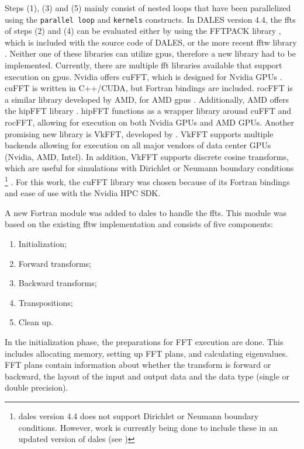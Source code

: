 Steps (1), (3) and (5) mainly consist of nested loops that have been parallelized using the \texttt{parallel loop} and \texttt{kernels} constructs. In DALES version 4.4, the \acrshort{fft}s of steps (2) and (4) can be evaluated either by using the FFTPACK library \citep{swarztrauberVectorizingFFTs1982}, which is included with the source code of DALES, or the more recent \acrfull{fftw} library \citep{frigoFFTWAdaptiveSoftware1998a}. Neither one of these libraries can utilize \acrshort{gpu}s, therefore a new library had to be implemented. Currently, there are multiple \acrshort{fft} libraries available that support execution on \acrshort{gpu}s. Nvidia offers cuFFT, which is designed for Nvidia GPUs \citep{nvidiaCuFFT}. cuFFT is written in C++/CUDA, but Fortran bindings are included. rocFFT is a similar library developed by AMD, for AMD \acrshort{gpu}s \citep{amdRocFFT2023}. Additionally, AMD offers the hipFFT library \citep{amdHipFFT2023}. hipFFT functions as a wrapper library around cuFFT and rocFFT, allowing for execution on both Nvidia GPUs and AMD GPUs. Another promising new library is VkFFT, developed by \citet{tolmachevVkFFTAPerformantCrossPlatform2023}. VkFFT supports multiple backends allowing for execution on all major vendors of data center GPUs (Nvidia, AMD, Intel). In addition, VkFFT supports discrete cosine transforms, which are useful for simulations with Dirichlet or Neumann boundary conditions \footnote{\acrshort{dales} version 4.4 does not support Dirichlet or Neumann boundary conditions. However, work is currently being done to include these in an updated version of \acrshort{dales} (see \citet{liquilungOpenBoundaryConditions2023})} \citep{schumannFastFourierTransforms1988}. For this work, the cuFFT library was chosen because of its Fortran bindings and ease of use with the Nvidia HPC SDK.

A new Fortran module was added to \acrshort{dales} to handle the \acrshort{fft}s. This module was based on the existing \acrshort{fftw} implementation and consists of five components:

\begin{enumerate}
  \item Initialization;
  \item Forward transforms;
  \item Backward transforms;
  \item Transpositions;
  \item Clean up.
\end{enumerate}

In the initialization phase, the preparations for FFT execution are done. This includes allocating memory, setting up FFT plans, and calculating eigenvalues. FFT plans contain information about whether the transform is forward or backward, the layout of the input and output data and the data type (single or double precision). 

